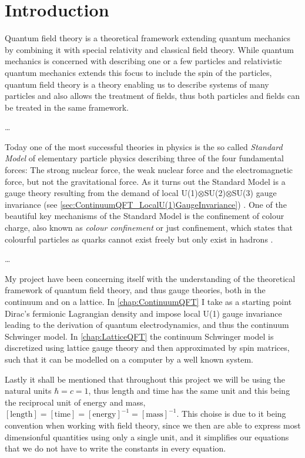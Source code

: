 \documentclass[../main.tex]{subfiles} %
\begin{document}
\chapter{Introduction} \label{chap:Introduction}

Quantum field theory is a theoretical framework extending quantum mechanics by combining it with special relativity and classical field theory. While quantum mechanics is concerned with describing one or a few particles and relativistic quantum mechanics extends this focus to include the spin of the particles, quantum field theory is a theory enabling us to describe systems of many particles and also allows the treatment of fields, thus both particles and fields can be treated in the same framework. \cite{stanford_QFT}

\ldots

Today one of the most successful theories in physics is the so called \emph{Standard Model} of elementary particle physics \cite{peskin_introToQFT_1995} describing three of the four fundamental forces: The strong nuclear force, the weak nuclear force and the electromagnetic force, but not the gravitational force. As it turns out the Standard Model is a gauge theory resulting from the demand of local U(1)$\otimes$SU(2)$\otimes$SU(3) gauge invariance (see \cref{sec:ContinuumQFT_LocalU(1)GaugeInvariance}) \cite{peskin_introToQFT_1995, stanford_historyOfQFT}.
One of the beautiful key mechanisms of the Standard Model is the confinement of colour charge, also known as \emph{colour confinement} or just confinement, which states that colourful particles as quarks cannot exist freely but only exist in hadrons \cite{peskin_introToQFT_1995, wilson_confinement_1974, griffiths_introToElementaryParticles_2008}.

\ldots

My project have been concerning itself with the understanding of the theoretical framework of quantum field theory, and thus gauge theories, both in the continuum and on a lattice. In \cref{chap:ContinuumQFT} I take as a starting point Dirac's fermionic Lagrangian density and impose local U(1) gauge invariance leading to the derivation of quantum electrodynamics, and thus the continuum Schwinger model. In \cref{chap:LatticeQFT} the continuum Schwinger model is discretized using lattice gauge theory and then approximated by spin matrices, such that it can be modelled on a computer by a well known system. %

Lastly it shall be mentioned that throughout this project we will be using the natural units $\hbar = c = 1$, thus length and time has the same unit and this being the reciprocal unit of energy and mass, $[\mathrm{length}] = [\mathrm{time}] = [\mathrm{energy}]^{-1} = [\mathrm{mass}]^{-1}$. This choise is due to it being convention when working with field theory, since we then are able to express most dimensionful quantities using only a single unit, and it simplifies our equations that we do not have to write the constants in every equation.
\end{document}
